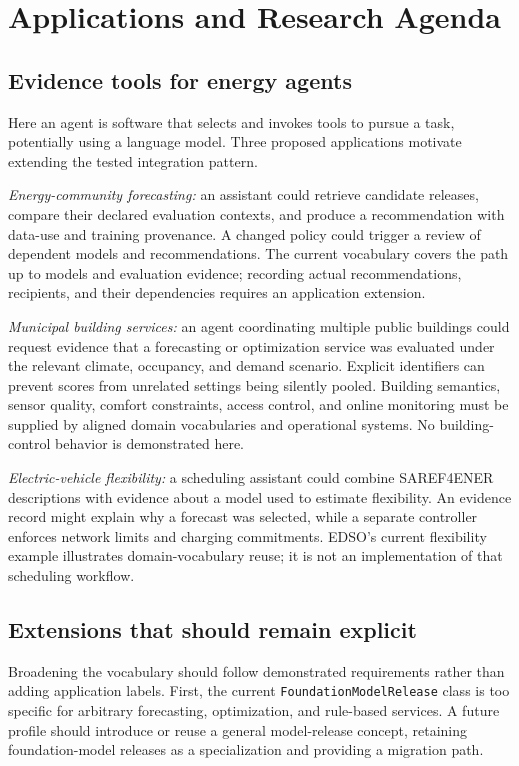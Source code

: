 \documentclass[conference]{IEEEtran}
\newcommand{\term}[1]{\texttt{#1}}
\begin{document}
\section{Applications and Research Agenda}
\subsection{Evidence tools for energy agents}
Here an agent is software that selects and invokes tools to pursue a task, potentially using a language model. Three proposed applications motivate extending the tested integration pattern.

\emph{Energy-community forecasting:} an assistant could retrieve candidate releases, compare their declared evaluation contexts, and produce a recommendation with data-use and training provenance. A changed policy could trigger a review of dependent models and recommendations. The current vocabulary covers the path up to models and evaluation evidence; recording actual recommendations, recipients, and their dependencies requires an application extension.

\emph{Municipal building services:} an agent coordinating multiple public buildings could request evidence that a forecasting or optimization service was evaluated under the relevant climate, occupancy, and demand scenario. Explicit identifiers can prevent scores from unrelated settings being silently pooled. Building semantics, sensor quality, comfort constraints, access control, and online monitoring must be supplied by aligned domain vocabularies and operational systems. No building-control behavior is demonstrated here.

\emph{Electric-vehicle flexibility:} a scheduling assistant could combine SAREF4ENER descriptions with evidence about a model used to estimate flexibility. An evidence record might explain why a forecast was selected, while a separate controller enforces network limits and charging commitments. EDSO's current flexibility example illustrates domain-vocabulary reuse; it is not an implementation of that scheduling workflow.

\subsection{Extensions that should remain explicit}
Broadening the vocabulary should follow demonstrated requirements rather than adding application labels. First, the current \term{FoundationModelRelease} class is too specific for arbitrary forecasting, optimization, and rule-based services. A future profile should introduce or reuse a general model-release concept, retaining foundation-model releases as a specialization and providing a migration path.
\end{document}
